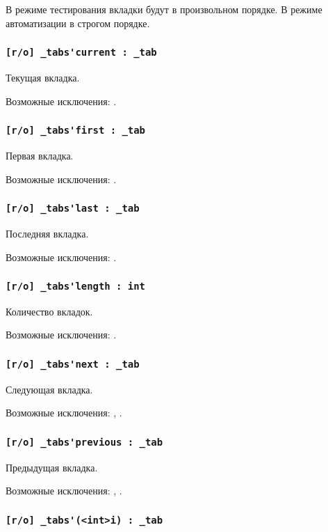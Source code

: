 В режиме тестирования вкладки будут в произвольном порядке. В режиме автоматизации в строгом порядке.

\subsubsection{\lstinline|[r/o] _tabs'current : _tab|}

Текущая вкладка.

Возможные исключения: .

\subsubsection{\lstinline|[r/o] _tabs'first : _tab|}

Первая вкладка.

Возможные исключения: .

\subsubsection{\lstinline|[r/o] _tabs'last : _tab|}

Последняя вкладка.

Возможные исключения: .

\subsubsection{\lstinline|[r/o] _tabs'length : int|}

Количество вкладок.

Возможные исключения: .

\subsubsection{\lstinline|[r/o] _tabs'next : _tab|}

Следующая вкладка.

Возможные исключения: , .

\subsubsection{\lstinline|[r/o] _tabs'previous : _tab|}

Предыдущая вкладка.

Возможные исключения: , .

\subsubsection{\lstinline|[r/o] _tabs'(<int>i) : _tab|}

